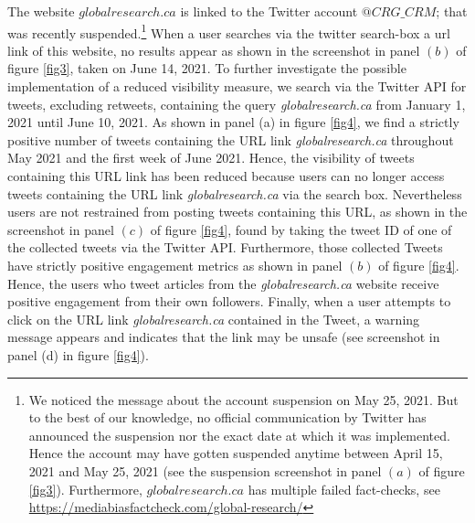 \documentclass[11pt,a4paper]{article}
\begin{document}
The website $globalresearch.ca$ is linked to the Twitter account {$@CRG\_CRM$}; that was recently suspended.\footnote{We noticed the message about the account suspension on May 25, 2021. But to the best of our knowledge, no official communication by Twitter has announced the suspension nor the exact date at which it was implemented. Hence the account may have gotten suspended anytime between April 15, 2021 and May 25, 2021 (see the suspension screenshot in panel $(a)$ of figure \ref{fig3}). Furthermore, $globalresearch.ca$ has multiple failed fact-checks, see \href{https://mediabiasfactcheck.com/global-research/}{https://mediabiasfactcheck.com/global-research/}} When a user searches via the twitter search-box a url link of this website, no results appear as shown in the screenshot in panel $(b)$ of figure \ref{fig3}, taken on June 14, 2021. To further investigate the possible implementation of a reduced visibility measure, we search via the Twitter API for tweets, excluding retweets, containing the query {\it globalresearch.ca} from January 1, 2021 until June 10, 2021.  As shown in panel (a) in figure \ref{fig4}, we find a strictly positive number of tweets containing the URL link {\it globalresearch.ca} throughout May 2021 and the first week of June 2021. Hence, the visibility of tweets containing this URL link has been reduced because users can no longer access tweets containing the URL link {\it globalresearch.ca} via the search box. Nevertheless users are not restrained from posting tweets containing this URL, as shown in the screenshot in panel $(c)$
 of figure \ref{fig4}, found by taking the tweet ID of one of the collected tweets via the Twitter API. Furthermore, those collected Tweets have strictly positive engagement metrics as shown in panel $(b)$ of figure \ref{fig4}. Hence, the users who tweet articles from the {\it globalresearch.ca} website receive positive engagement from their own followers. Finally, when a user attempts to click on the URL link {\it globalresearch.ca} contained in the Tweet, a warning message appears and indicates that the link may be unsafe (see screenshot in panel (d) in figure \ref{fig4}). 


\end{document}

